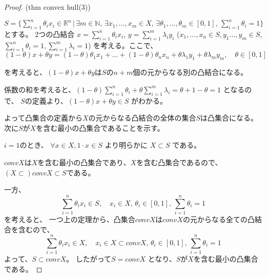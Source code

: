\documentclass[12pt]{jsarticle}
\begin{document}
\begin{proof}
(thm convex hull(3))

$S = \{ \sum \limits_{i=1}^n \theta_i x_i \in \mathbb{R}^n\, | \, \exists m \in \mathbb{N}, \, \exists x_1, ... , x_m \in X,    \, \exists \theta_1, ..., \theta_m \in [0, 1],  \, \sum \limits_{i=1}^n \theta_i = 1 \} $
とする。
2つの凸結合
$x = \sum \limits_{i=1}^n \theta_i x_i $,  $y = \sum \limits_{i=1}^m \lambda_i y_i $ ($ x_1, ..., x_n \in S,   y_1 ..., y_m \in S$,  $\sum \limits_{i=1}^n \theta_i = 1,  \sum \limits_{i=1}^m \lambda_i = 1 $)
を考える。ここで、
\[
  (1 - \theta )x +  \theta y = (1 - \theta) \theta_1 x_1 + ... + (1 - \theta) \theta_n x_n + \theta \lambda_1 y_1 + \theta \lambda_m y_m,  \quad \theta \in [0, 1]
 \]
 
 を考えると、$(1 - \theta )x +  \theta y$は$S$の$n+m$個の元からなる別の凸結合になる。
 
 係数の和を考えると、$(1 - \theta) \sum \limits_{i=1}^n \theta_i +  \theta \sum \limits_{i=1}^m \lambda_i = \theta + 1 - \theta = 1$ となるので、
 $S$の定義より、$(1 - \theta )x +  \theta y \in S$
がわかる。
 
 よって凸集合の定義から$X$の元からなる凸結合の全体の集合$S$は凸集合になる。\\
 
次に$S$が$X$を含む最小の凸集合であることを示す。

$i = 1$のとき、
$\forall x \in X,1 \cdot x \in S$
 より明らかに
 $X \subset S$
 である。

$conv X$は$X$を含む最小の凸集合であり、$X$を含む凸集合であるので、$(X \subset) conv X \subset S$である。

一方、
\[
\sum \limits_{i=1}^n \theta_ix_i \in S ,  \quad x_i\in X, \, \theta_i \in [0, 1],  \, \sum \limits_{i=1}^n \theta_i = 1
\]
を考えると、
一つ上の定理から、凸集合$conv X$は$conv X$の元からなる全ての凸結合を含むので、
\[
\sum \limits_{i=1}^n \theta_ix_i \in X,  \quad x_i\in X \subset conv X, \, \theta_i \in [0, 1],  \, \sum \limits_{i=1}^n \theta_i = 1
\]
よって、$S \subset conv X$。
したがって$S = conv X$ となり、$S$が$X$を含む最小の凸集合である。
\end{proof}
\end{document}

